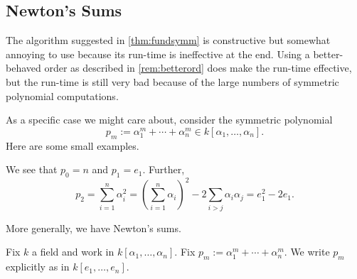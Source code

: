 \subsection{Newton's Sums}
The algorithm suggested in \autoref{thm:fundsymm} is constructive but somewhat annoying to use because its run-time is ineffective at the end. Using a better-behaved order as described in \autoref{rem:betterord} does make the run-time effective, but the run-time is still very bad because of the large numbers of symmetric polynomial computations.

As a specific case we might care about, consider the symmetric polynomial
\[p_m:=\alpha_1^m+\cdots+\alpha_n^m\in k[\alpha_1,\ldots,\alpha_n].\]
Here are some small examples.
\begin{ex}
	We see that $p_0=n$ and $p_1=e_1.$ Further,
	\[p_2=\sum_{i=1}^n\alpha_i^2=\left(\sum_{i=1}^n\alpha_i\right)^2-2\sum_{i>j}\alpha_i\alpha_j=e_1^2-2e_1.\]
\end{ex}
More generally, we have Newton's sums.
\begin{exercise}
	Fix $k$ a field and work in $k[\alpha_1,\ldots,\alpha_n].$ Fix $p_m:=\alpha_1^m+\cdots+\alpha_n^m.$ We write $p_m$ explicitly as in $k[e_1,\ldots,e_n].$
\end{exercise}
